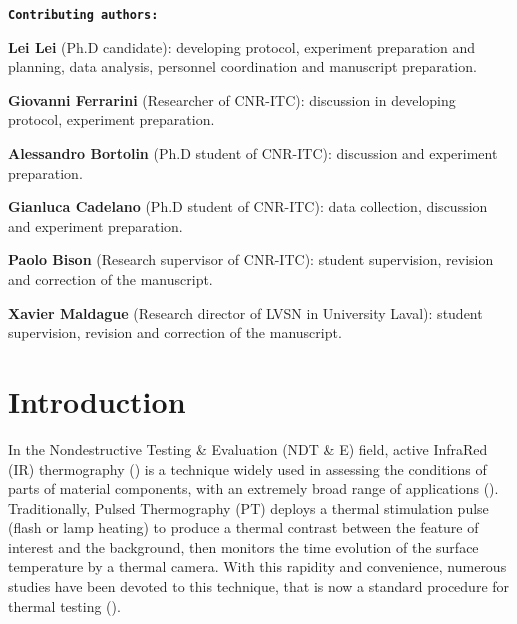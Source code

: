\newpage
\textbf{\texttt{Contributing authors:}}

\textbf{\textsf{Lei Lei}} (Ph.D candidate): developing protocol, experiment preparation and planning, data analysis,  personnel coordination and manuscript preparation.

\textbf{Giovanni Ferrarini} (Researcher of CNR-ITC): discussion in developing protocol, experiment preparation.

\textbf{Alessandro Bortolin} (Ph.D student of CNR-ITC): discussion and experiment preparation.

\textbf{Gianluca Cadelano} (Ph.D student of CNR-ITC): data collection, discussion and experiment preparation.

\textbf{Paolo Bison} (Research supervisor of CNR-ITC): student supervision, revision and correction of the manuscript. 

\textbf{Xavier Maldague} (Research director of LVSN in University Laval): student supervision, revision and correction of the manuscript.


% 
\newpage
\section{Introduction}
\label{sect:intro}  %
In the Nondestructive Testing \& Evaluation (NDT \& E) field, active InfraRed (IR) thermography (\citet{Maldague2001theory}) is a technique widely used in assessing the conditions of parts of material components, with an extremely broad range of applications (\citet{Vavilov2017Thermal, Cadelano2016Corrosion}). Traditionally, Pulsed Thermography (PT) deploys a thermal stimulation pulse (flash or lamp heating) to produce a thermal contrast between the feature of interest and the background, then monitors the time evolution of the surface temperature by a thermal camera. With this rapidity and convenience, numerous studies have been devoted to this technique, that is now a standard procedure for thermal testing (\citet{Maldague1993Nondestructive,Maldague1994bInfra,2007-Ibarra-Castanedo,2011-ClementeIbarra-Castanedo,duan2013quantitative,Vavilov2015Review}). 

